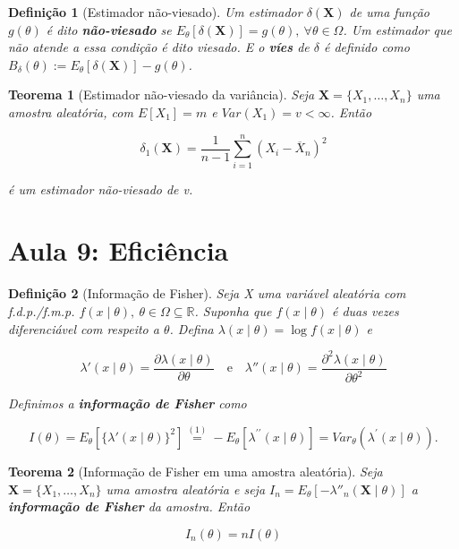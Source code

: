 \documentclass{article}
\newtheorem{theorem}{Teorema}
\newtheorem{definition}{Definição}
\begin{document}
	\begin{definition}[Estimador não-viesado]
		Um estimador $\delta(\textbf{X})$ de uma função $g(\theta)$ é dito \textbf{não-viesado} se $E_\theta[\delta(\textbf{X})] = g(\theta), \ \forall \theta \in \Omega$. Um estimador que não atende a essa condição é dito viesado. E o \textbf{víes} de $\delta$ é definido como $B_\delta(\theta) := E_\theta[\delta(\textbf{X})] - g(\theta)$.
	\end{definition}
	
	\begin{theorem}[Estimador não-viesado da variância]
		Seja $\textbf{X} = \{ X_1, \ldots, X_n \}$ uma amostra aleatória, com $E[X_1] = m$ e $Var(X_1) = v < \infty$. Então
		
		$$\delta_1(\textbf{X}) = \frac{1}{n - 1}\sum_{i = 1}^n (X_i - \overline{X}_n)^2$$
		
		é um estimador não-viesado de v.
	\end{theorem}
	
	\section*{Aula 9: Eficiência}
	\label{s9}
	\begin{definition}[Informação de Fisher]\label{def:fis}
		Seja X uma variável aleatória com f.d.p./f.m.p. $f(x \mid \theta), \ \theta \in \Omega \subseteq \mathbb{R}$. Suponha que $f(x \mid \theta)$ é duas vezes diferenciável com respeito a $\theta$. Defina $\lambda (x \mid \theta) = \log f(x \mid \theta)$ e
		
		\begin{equation}
			\lambda' (x \mid \theta) = \frac{\partial \lambda (x \mid \theta)}{\partial \theta} \quad \mathrm{e} \quad \lambda'' (x \mid \theta) = \frac{\partial^2 \lambda(x \mid \theta)}{\partial \theta^2}
		\end{equation}
		
		Definimos a \textbf{informação de Fisher} como
		
		\begin{equation}
			I(\theta) = E_\theta \left [ \{ \lambda'(x \mid \theta) \}^2 \right ] \stackrel{\mathrm{(1)}}{=} -E_\theta\left[\lambda^{\prime\prime}(x \mid \theta)\right] = Var_\theta\left(\lambda^{\prime}(x\mid \theta) \right).
		\end{equation}
	\end{definition}
	
	\begin{theorem}[Informação de Fisher em uma amostra aleatória]
		Seja $\textbf{X} = \{ X_1, \ldots, X_n \}$ uma amostra aleatória e seja $I_n = E_\theta [- \lambda''_n (\textbf{X} \mid \theta)]$ a \textbf{informação de Fisher} da amostra. Então
		
		$$I_n(\theta) = n I(\theta)$$
	\end{theorem}
	
\end{document}
